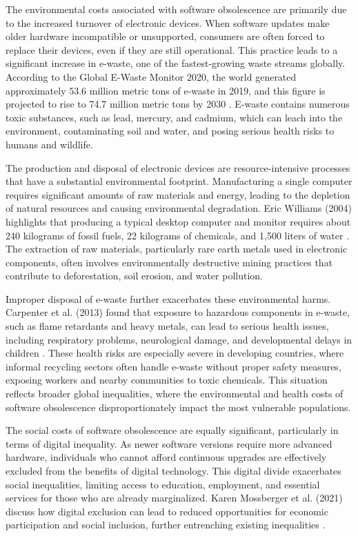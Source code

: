 \begin{refsection}
The environmental costs associated with software obsolescence are primarily due to the increased turnover of electronic devices. When software updates make older hardware incompatible or unsupported, consumers are often forced to replace their devices, even if they are still operational. This practice leads to a significant increase in e-waste, one of the fastest-growing waste streams globally. According to the Global E-Waste Monitor 2020, the world generated approximately 53.6 million metric tons of e-waste in 2019, and this figure is projected to rise to 74.7 million metric tons by 2030 \cite[pp.~2]{forti2020global}. E-waste contains numerous toxic substances, such as lead, mercury, and cadmium, which can leach into the environment, contaminating soil and water, and posing serious health risks to humans and wildlife.

The production and disposal of electronic devices are resource-intensive processes that have a substantial environmental footprint. Manufacturing a single computer requires significant amounts of raw materials and energy, leading to the depletion of natural resources and causing environmental degradation. Eric Williams (2004) highlights that producing a typical desktop computer and monitor requires about 240 kilograms of fossil fuels, 22 kilograms of chemicals, and 1,500 liters of water \cite[pp.~620]{williams2004energy}. The extraction of raw materials, particularly rare earth metals used in electronic components, often involves environmentally destructive mining practices that contribute to deforestation, soil erosion, and water pollution.

Improper disposal of e-waste further exacerbates these environmental harms. Carpenter et al. (2013) found that exposure to hazardous components in e-waste, such as flame retardants and heavy metals, can lead to serious health issues, including respiratory problems, neurological damage, and developmental delays in children \cite[pp.~e353]{carpenter2013health}. These health risks are especially severe in developing countries, where informal recycling sectors often handle e-waste without proper safety measures, exposing workers and nearby communities to toxic chemicals. This situation reflects broader global inequalities, where the environmental and health costs of software obsolescence disproportionately impact the most vulnerable populations.

The social costs of software obsolescence are equally significant, particularly in terms of digital inequality. As newer software versions require more advanced hardware, individuals who cannot afford continuous upgrades are effectively excluded from the benefits of digital technology. This digital divide exacerbates social inequalities, limiting access to education, employment, and essential services for those who are already marginalized. Karen Mossberger et al. (2021) discuss how digital exclusion can lead to reduced opportunities for economic participation and social inclusion, further entrenching existing inequalities \cite[pp.~79-81]{mossberger2021digital}.


\end{refsection}
